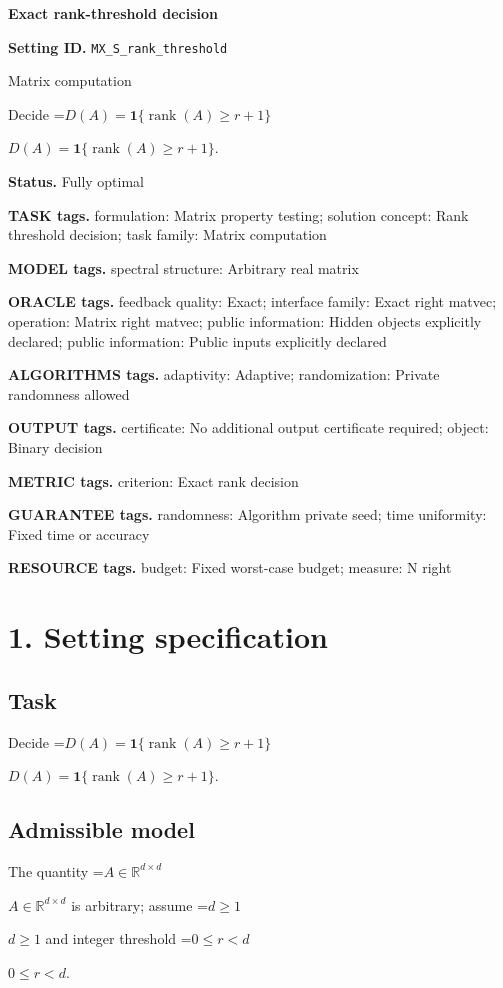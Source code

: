 \documentclass[10pt,a4paper]{article}
\newcommand{\AtlasMath}[1]{\par\begingroup\centering\setbox0=\hbox{$\displaystyle #1$}\ifdim\wd0>1.4\linewidth\typeout{ATLAS WIDE FORMULA: \the\wd0}\fi\ifdim\wd0>\linewidth\resizebox{\linewidth}{!}{\box0}\else\box0\fi\par\endgroup}
\newcommand{\AtlasInlineMath}[1]{\begingroup\setbox0=\hbox{$#1$}\ifdim\wd0>.4\linewidth\endgroup\AtlasMath{#1}\else\endgroup$#1$\fi}
\begin{document}
\raggedright

{\LARGE\bfseries\sffamily\color{AtlasNavy} Exact rank-threshold decision\par}\vspace{5pt}
\textbf{Setting ID.} \texttt{MX\_\allowbreak{}S\_\allowbreak{}rank\_\allowbreak{}threshold}

Matrix computation

Decide \AtlasInlineMath{D(A)=\mathbf1\{\operatorname{rank}(A)\ge r+1\}}.

\textbf{Status.} Fully optimal

\textbf{TASK tags.} formulation: Matrix property testing; solution concept: Rank threshold decision; task family: Matrix computation

\textbf{MODEL tags.} spectral structure: Arbitrary real matrix

\textbf{ORACLE tags.} feedback quality: Exact; interface family: Exact right matvec; operation: Matrix right matvec; public information: Hidden objects explicitly declared; public information: Public inputs explicitly declared

\textbf{ALGORITHMS tags.} adaptivity: Adaptive; randomization: Private randomness allowed

\textbf{OUTPUT tags.} certificate: No additional output certificate required; object: Binary decision

\textbf{METRIC tags.} criterion: Exact rank decision

\textbf{GUARANTEE tags.} randomness: Algorithm private seed; time uniformity: Fixed time or accuracy

\textbf{RESOURCE tags.} budget: Fixed worst-case budget; measure: N right

\section{1. Setting specification}
\subsection{Task}
Decide \AtlasInlineMath{D(A)=\mathbf1\{\operatorname{rank}(A)\ge r+1\}}.

\subsection{Admissible model}
The quantity \AtlasInlineMath{A\in\mathbb{R}^{d\times d}} is arbitrary; assume \AtlasInlineMath{d\ge1} and integer threshold \AtlasInlineMath{0\le r<d}.
\end{document}
